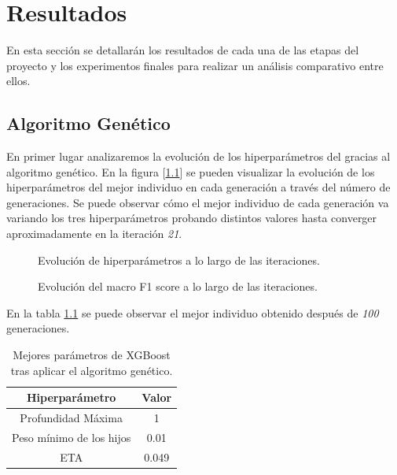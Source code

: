 
\chapter{Resultados}
\label{resultados}



  En esta sección se detallarán los resultados de cada una de las etapas del proyecto y los experimentos finales para realizar un análisis comparativo entre ellos.


\section{Algoritmo Genético}

  En primer lugar analizaremos la evolución de los hiperparámetros del  gracias al algoritmo genético. En la figura [\ref{EvolucionHiperparametrosImage}] se pueden visualizar la evolución de los hiperparámetros del mejor individuo en cada generación a través del número de generaciones. Se puede observar cómo el mejor individuo de cada generación va variando los tres hiperparámetros probando distintos valores hasta converger aproximadamente en la iteración \textit{21}.

  \begin{figure}[H]
      \centering
      
      \caption{Evolución de hiperparámetros a lo largo de las iteraciones.}
      \label{EvolucionHiperparametrosImage}
   \end{figure}

  \begin{figure}[H]
      \centering
      
      \caption{Evolución del macro F1 score a lo largo de las iteraciones.}
      \label{EvolucionF1ScoreImage}
   \end{figure}

  En la tabla \ref{BestGASolutionTable} se puede observar el mejor individuo obtenido después de \textit{100} generaciones.

  \begin{table}[H]
      \centering
          \begin{tabular}{ |c|c| } 
              \hline
              \textbf{Hiperparámetro} & \textbf{Valor}\\
              \hline
                  Profundidad Máxima & 1 \\
                  Peso mínimo de los hijos & 0.01 \\ 
                  ETA & 0.049 \\ 
              \hline

          \end{tabular}
      \caption{Mejores parámetros de XGBoost tras aplicar el algoritmo genético.}
      \label{BestGASolutionTable}
  \end{table}

